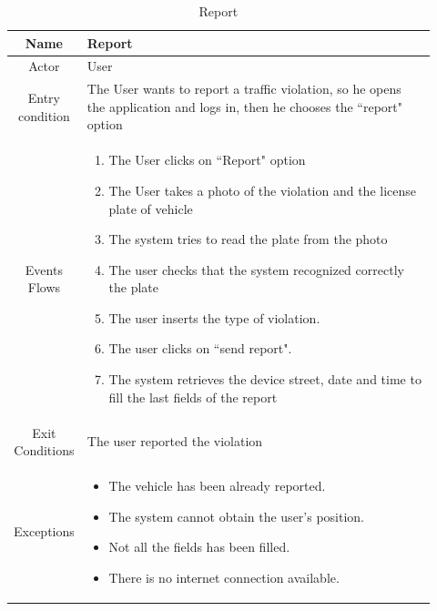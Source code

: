 \documentclass[12pt,a4paper]{report}
\begin{document}
				\begin{table}[H]
					\centering
					\begin{tabular}{|c|p{0.92\linewidth}|}
						\hline
						Name & {Report} \\
						\hline
						Actor & {User} \\
						\hline
						Entry condition & {The User wants to report a traffic violation, so he opens the application and logs in,
									then he chooses the ``report" option} \\
						\hline
						Events Flows &{ 
								\vskip 4pt
								\begin{enumerate}
									\item The User clicks on ``Report" option
									\item The User takes a photo of the violation and the license plate of vehicle
									\item The system tries to read the plate from the photo
									\item The user checks that the system recognized correctly the plate
									\item The user inserts the type of violation.
									\item The user clicks on ``send report".
									\item The system retrieves the device street, date and time to fill the last fields
										of the report
								\end{enumerate}
								\vskip 4pt}\\
						\hline
						Exit Conditions & {The user reported the violation} \\
						\hline
						Exceptions & {
								\vskip 4pt
								\begin{itemize}
									\item The vehicle has been already reported.
									\item The system cannot obtain the user's position.
									\item Not all the fields has been filled.
									\item There is no internet connection available.
								\end{itemize}
								\vskip 4pt
						} \\
						\hline
					\end{tabular}
					\caption{Report}
					\label{tab: }
				\end{table}
\end{document}
